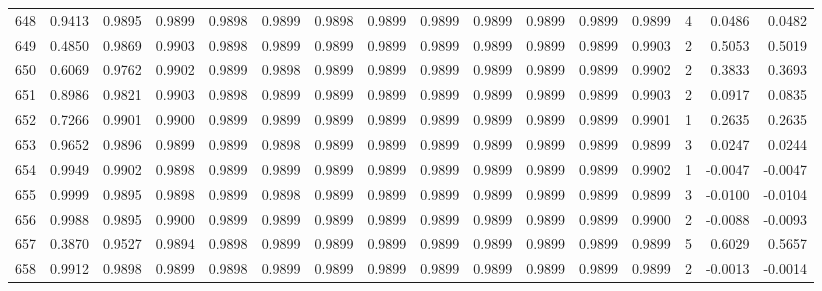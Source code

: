 \begin{tabular}{lrrrrrrrrrrrrrrr}
648 &      0.9413 &  0.9895 &  0.9899 &  0.9898 &  0.9899 &  0.9898 &  0.9899 &  0.9899 &  0.9899 &  0.9899 &   0.9899 &     0.9899 &      4 &                    0.0486 &                     0.0482 \\
649 &      0.4850 &  0.9869 &  0.9903 &  0.9898 &  0.9899 &  0.9899 &  0.9899 &  0.9899 &  0.9899 &  0.9899 &   0.9899 &     0.9903 &      2 &                    0.5053 &                     0.5019 \\
650 &      0.6069 &  0.9762 &  0.9902 &  0.9899 &  0.9898 &  0.9899 &  0.9899 &  0.9899 &  0.9899 &  0.9899 &   0.9899 &     0.9902 &      2 &                    0.3833 &                     0.3693 \\
651 &      0.8986 &  0.9821 &  0.9903 &  0.9898 &  0.9899 &  0.9899 &  0.9899 &  0.9899 &  0.9899 &  0.9899 &   0.9899 &     0.9903 &      2 &                    0.0917 &                     0.0835 \\
652 &      0.7266 &  0.9901 &  0.9900 &  0.9899 &  0.9899 &  0.9899 &  0.9899 &  0.9899 &  0.9899 &  0.9899 &   0.9899 &     0.9901 &      1 &                    0.2635 &                     0.2635 \\
653 &      0.9652 &  0.9896 &  0.9899 &  0.9899 &  0.9898 &  0.9899 &  0.9899 &  0.9899 &  0.9899 &  0.9899 &   0.9899 &     0.9899 &      3 &                    0.0247 &                     0.0244 \\
654 &      0.9949 &  0.9902 &  0.9898 &  0.9899 &  0.9899 &  0.9899 &  0.9899 &  0.9899 &  0.9899 &  0.9899 &   0.9899 &     0.9902 &      1 &                   -0.0047 &                    -0.0047 \\
655 &      0.9999 &  0.9895 &  0.9898 &  0.9899 &  0.9898 &  0.9899 &  0.9899 &  0.9899 &  0.9899 &  0.9899 &   0.9899 &     0.9899 &      3 &                   -0.0100 &                    -0.0104 \\
656 &      0.9988 &  0.9895 &  0.9900 &  0.9899 &  0.9899 &  0.9899 &  0.9899 &  0.9899 &  0.9899 &  0.9899 &   0.9899 &     0.9900 &      2 &                   -0.0088 &                    -0.0093 \\
657 &      0.3870 &  0.9527 &  0.9894 &  0.9898 &  0.9899 &  0.9899 &  0.9899 &  0.9899 &  0.9899 &  0.9899 &   0.9899 &     0.9899 &      5 &                    0.6029 &                     0.5657 \\
658 &      0.9912 &  0.9898 &  0.9899 &  0.9898 &  0.9899 &  0.9899 &  0.9899 &  0.9899 &  0.9899 &  0.9899 &   0.9899 &     0.9899 &      2 &                   -0.0013 &                    -0.0014 \\

\end{tabular}
